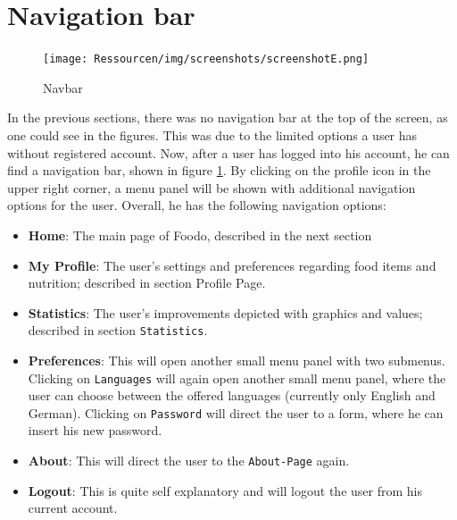 \section*{Navigation bar}
\vspace{-2em}
\begin{figure}[H]
	\captionsetup{justification=centering}
	\begin{center}
		\texttt{[image: Ressourcen/img/screenshots/screenshotE.png]}
		\vspace{-3em}
		\caption{Navbar}
		\label{fig:navbar}
	\end{center}
\end{figure}
\vspace{-3em}
In the previous sections, there was no navigation bar at the top of the screen, as one could see in the figures. This was due to the limited options a user has without registered account. Now, after a user has logged into his account, he can find a navigation bar, shown in figure \ref{fig:navbar}. By clicking on the profile icon in the upper right corner, a menu panel will be shown with additional navigation options for the user. Overall, he has the following navigation options:
\begin{itemize}
\item \textbf{Home}: The main page of Foodo, described in the next section
\item \textbf{My Profile}: The user's settings and preferences regarding food items and nutrition; described in section Profile Page.
\item \textbf{Statistics}: The user's improvements depicted with graphics and values; described in section \texttt{Statistics}.
\item \textbf{Preferences}: This will open another small menu panel with two submenus. Clicking on \texttt{Languages} will again open another small menu panel, where the user can choose between the offered languages (currently only English and German). Clicking on \texttt{Password} will direct the user to a form, where he can insert his new password.
\item \textbf{About}: This will direct the user to the \texttt{About-Page} again.
\item \textbf{Logout}: This is quite self explanatory and will logout the user from his current account.
\end{itemize}
